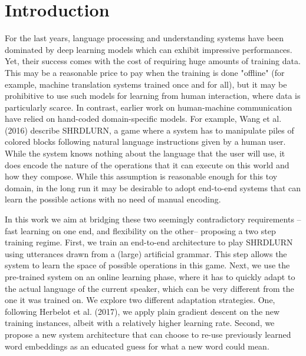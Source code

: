 \section{Introduction}

For the last years, language processing and understanding systems have been
dominated by deep learning models which can exhibit impressive performances.
Yet, their success comes with the cost of requiring huge amounts of training
data. This may be a reasonable price to pay when the training is done "offline"
(for example, machine translation systems trained once and for all), but it may
be prohibitive to use such models for learning from human interaction, where
data is particularly scarce. In contrast, earlier work on human-machine
communication have relied on hand-coded domain-specific models.  For example,
Wang et al. (2016) describe SHRDLURN, a game where a system has to manipulate
piles of colored blocks following natural language instructions given by a
human user. While the system knows nothing about the language that the user
will use, it does encode the nature of the operations that it can execute on
this world and how they compose. While this assumption is reasonable enough for
this toy domain, in the long run it may be desirable to adopt end-to-end
systems that can learn the possible actions with no need of manual encoding. 

In this work we aim at bridging these two seemingly contradictory requirements
--fast learning on one end, and flexibility on the other-- proposing a two step
training regime. First, we train an end-to-end architecture to play SHRDLURN
using utterances drawn from a (large) artificial grammar. This step allows the
system to learn the space of possible operations in this game.  Next, we use
the pre-trained system on an online learning phase, where it has to quickly
adapt to the actual language of the current speaker, which can be very
different from the one it was trained on. We explore two different adaptation
strategies. One, following Herbelot et al. (2017), we apply plain gradient
descent on the new training instances, albeit with a relatively higher learning
rate. Second, we propose a new system architecture that can choose to re-use
previously learned word embeddings as an educated guess for what a new word
could mean.  
